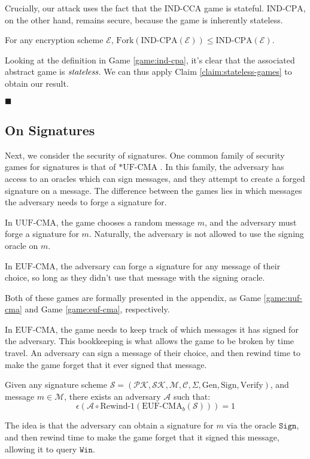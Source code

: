 Crucially, our attack uses the fact that the $\text{IND-CCA}$ game
is stateful.
$\text{IND-CPA}$, on the other hand, remains secure, because
the game is inherently stateless.

\begin{claim}
\label{claim:ind-cpa-secure}
For any encryption scheme $\mathcal{E}$,
$\text{Fork}(\text{IND-CPA}(\mathcal{E})) \leq \text{IND-CPA}(\mathcal{E})$.
\end{claim}

Looking at the definition in Game \ref{game:ind-cpa}, it's clear
that the associated abstract game is $\emph{stateless}$.
We can thus apply Claim \ref{claim:stateless-games} to obtain our result.

$\blacksquare$

\subsection{On Signatures}

Next, we consider the security of signatures.
One common family of security games for signatures is that of
$*\text{UF-CMA}$ \cite{gmr88}.
In this family, the adversary has access to an oracles which can
sign messages, and they attempt to create a forged signature on a message.
The difference between the games lies in which messages the adversary
needs to forge a signature for.

In $\text{UUF-CMA}$, the game chooses a random message $m$, and the adversary
must forge a signature for $m$.
Naturally, the adversary is not allowed to use the signing oracle on
$m$.

In $\text{EUF-CMA}$, the adversary can forge a signature for any message
of their choice, so long as they didn't use that message
with the signing oracle.

Both of these games are formally presented in the appendix,
as Game \ref{game:uuf-cma} and Game \ref{game:euf-cma}, respectively.

In $\text{EUF-CMA}$, the game needs to keep track of which messages
it has signed for the adversary.
This bookkeeping is what allows the game to be broken by time travel.
An adversary can sign a message of their choice, and then rewind time
to make the game forget that it ever signed that message.

\begin{claim}
\label{claim:euf-cma}
Given any signature scheme
$\mathcal{S} = (\mathcal{PK}, \mathcal{SK}, \mathcal{M}, \mathcal{C}, \Sigma, \text{Gen}, \text{Sign}, \text{Verify})$, and message $m \in \mathcal{M}$,
there exists an adversary $\mathcal{A}$ such that:
$$
\epsilon(\mathcal{A} \circ \text{Rewind-1}(\text{EUF-CMA}_b(\mathcal{S}))) = 1
$$
\end{claim}
The idea is that the adversary can obtain a signature for $m$
via the oracle $\texttt{Sign}$, and then rewind time to make the game
forget that it signed this message, allowing it to query $\texttt{Win}$.


